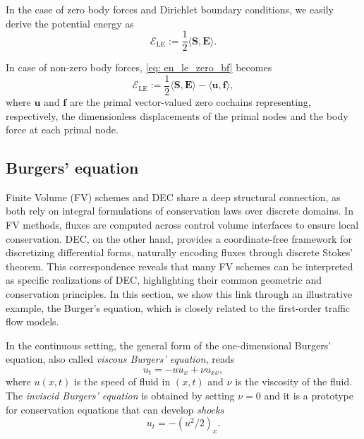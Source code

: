 \documentclass{article}
\theoremstyle{definition} %
\theoremstyle{plain} %
\theoremstyle{remark} %
\begin{document}
In the case of zero body forces and Dirichlet boundary conditions, we easily derive the potential energy as
\begin{equation}
    \mathcal{E}_{\text{LE}} := \frac{1}{2}\langle \mathbf{S}, \mathbf{E} \rangle. \label{eq: en_le_zero_bf}
\end{equation}

In case of non-zero body forces, \eqref{eq: en_le_zero_bf} becomes
\begin{equation}
    \mathcal{E}_{\text{LE}} := \frac{1}{2}\langle \mathbf{S}, \mathbf{E} \rangle - \langle \mathbf{u}, \mathbf{f} \rangle,
\end{equation}
where $\mathbf{u}$ and $\mathbf{f}$ are the primal vector-valued zero cochains representing, respectively, the dimensionless displacements of the primal nodes and the body force at each primal node.

\subsection{Burgers' equation}
\label{sec: dec_fv}
Finite Volume (FV) schemes and DEC share a deep structural connection, as both rely on integral formulations of conservation laws over discrete domains. In FV methods, fluxes are computed across control volume interfaces to ensure local conservation. DEC, on the other hand, provides a coordinate-free framework for discretizing differential forms, naturally encoding fluxes through discrete Stokes’ theorem. This correspondence reveals that many FV schemes can be interpreted as specific realizations of DEC, highlighting their common geometric and conservation principles. In this section, we show this link through an illustrative example, the Burger's equation, which is closely related to the first-order traffic flow models.

In the continuous setting, the general form of the one-dimensional Burgers' equation, also called \textsl{viscous Burgers' equation}, reads
\begin{equation}
	u_t = - uu_x + \nu u_{xx}, \label{eq: viscidburgers}
\end{equation}
where $u(x,t)$ is the speed of fluid in $(x,t)$ and $\nu$ is the viscosity of the fluid. The \textsl{inviscid Burgers' equation} is obtained by setting $\nu = 0$ and it is a prototype for conservation equations that can develop \textsl{shocks}
\begin{equation}
		u_t = -(u^2/2)_x.
\end{equation} 
\end{document}
